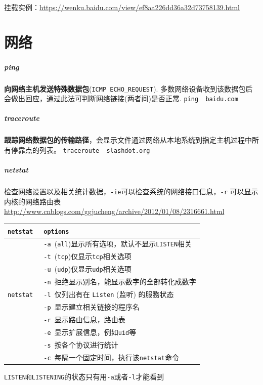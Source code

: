 \documentclass[UTF8,a4paper,12pt]{ctexbook}
\begin{document}
				挂载实例：\url{https://wenku.baidu.com/view/ef8aa226dd36a32d73758139.html}
	\section{网络}	
			\subparagraph{ping} \textbf{向网络主机发送特殊数据包}(\verb|ICMP ECHO_REQUEST|). 多数网络设备收到该数据包后会做出回应，通过此法可判断网络链接(两者间)是否正常. \verb|ping  baidu.com|
			
			\subparagraph{traceroute} \textbf{跟踪网络数据包的传输路径}，会显示文件通过网络从本地系统到指定主机过程中所有停靠点的列表。 \verb|traceroute  slashdot.org|
			
			\subparagraph{netstat} 检查网络设置以及相关统计数据，\verb|-ie|可以检查系统的网络接口信息，\verb|-r| 可以显示内核的网络路由表
				\url{http://www.cnblogs.com/ggjucheng/archive/2012/01/08/2316661.html}
				
				\begin{table}[H]
					\centering
					\begin{tabular}{l|m{12cm}}
						\hline
						\verb|netstat |   	   & \verb|options| \\
						\hline
						\verb| |   	   & \verb|-a |(\verb|all|)显示所有选项，默认不显示\verb|LISTEN|相关 \\
						\verb| |   	   & \verb|-t |(\verb|tcp|)仅显示\verb|tcp|相关选项\\
						\verb| |   	   & \verb|-u |(\verb|udp|)仅显示\verb|udp|相关选项 \\
						\verb| |   	   & \verb|-n |拒绝显示别名，能显示数字的全部转化成数字 \\
						\verb|netstat |   	   & \verb|-l |仅列出有在 \verb|Listen| (监听) 的服務状态\\
						\verb| |   	   & \verb|-p |显示建立相关链接的程序名 \\
						\verb| |   	   & \verb|-r |显示路由信息，路由表 \\
						\verb| |   	   & \verb|-e |显示扩展信息，例如\verb|uid|等\\
						\verb| |   	   & \verb|-s |按各个协议进行统计 \\
						\verb| |   	   & \verb|-c |每隔一个固定时间，执行该\verb|netstat|命令\\
						\hline
					\end{tabular}
				\end{table}	
					
				\verb|LISTEN和LISTENING|的状态只有用\verb|-a|或者\verb|-l|才能看到
				
\end{document}
